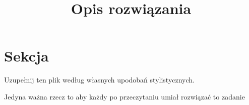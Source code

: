 \documentclass[12pt]{article}
\title{Opis rozwiązania}
\date{} %
\begin{document}
\maketitle

\section{Sekcja}
    Uzupełnij ten plik według własnych upodobań stylistycznych.

    Jedyna ważna rzecz to aby każdy po przeczytaniu umiał rozwiązać to zadanie
\end{document}

